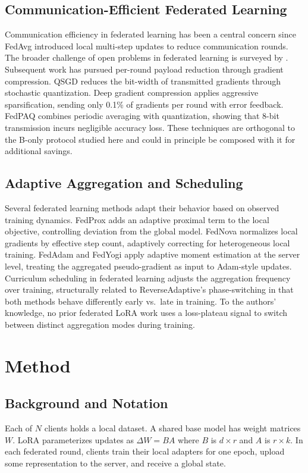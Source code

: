 \subsection{Communication-Efficient Federated Learning}
Communication efficiency in federated learning has been a central concern since FedAvg \citep{mcmahan2017communication} introduced local multi-step updates to reduce communication rounds. The broader challenge of open problems in federated learning is surveyed by \citet{kairouz2021advances}. Subsequent work has pursued per-round payload reduction through gradient compression. QSGD \citep{alistarh2017qsgd} reduces the bit-width of transmitted gradients through stochastic quantization. Deep gradient compression \citep{lin2017deep} applies aggressive sparsification, sending only 0.1\% of gradients per round with error feedback. FedPAQ \citep{reisizadeh2020fedpaq} combines periodic averaging with quantization, showing that 8-bit transmission incurs negligible accuracy loss. These techniques are orthogonal to the B-only protocol studied here and could in principle be composed with it for additional savings.

\subsection{Adaptive Aggregation and Scheduling}
Several federated learning methods adapt their behavior based on observed training dynamics. FedProx \citep{li2020fedprox} adds an adaptive proximal term to the local objective, controlling deviation from the global model. FedNova \citep{wang2020fednova} normalizes local gradients by effective step count, adaptively correcting for heterogeneous local training. FedAdam and FedYogi \citep{reddi2020adaptive} apply adaptive moment estimation at the server level, treating the aggregated pseudo-gradient as input to Adam-style updates. Curriculum scheduling in federated learning adjusts the aggregation frequency over training, structurally related to ReverseAdaptive's phase-switching in that both methods behave differently early vs.\ late in training. To the authors' knowledge, no prior federated LoRA work uses a loss-plateau signal to switch between distinct aggregation modes during training.

\section{Method}
\label{sec:method}

\subsection{Background and Notation}
Each of $N$ clients holds a local dataset. A shared base model has weight matrices $W$. LoRA \citep{hu2022lora} parameterizes updates as $\Delta W = BA$ where $B$ is $d \times r$ and $A$ is $r \times k$. In each federated round, clients train their local adapters for one epoch, upload some representation to the server, and receive a global state.

